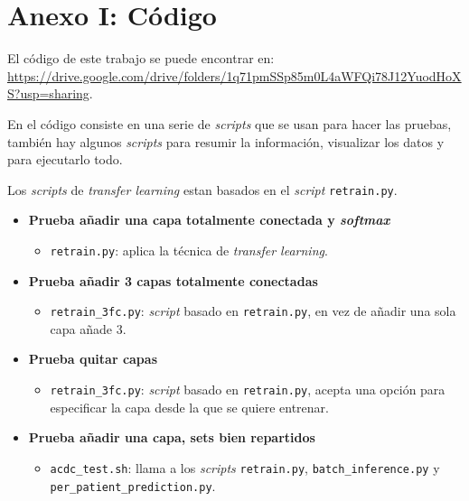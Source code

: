 \documentclass[12pt,a4paper]{article}
\begin{document}
\newpage
\appendix
\addappheadtotoc
\appendixpage
\section{Anexo I: Código}\label{anexo1}
El código de este trabajo se puede encontrar en: \url{https://drive.google.com/drive/folders/1q71pmSSp85m0L4aWFQi78J12YuodHoXS?usp=sharing}.
\bigskip

En el código consiste en una serie de \textit{scripts} que se usan para hacer las pruebas, también hay algunos \textit{scripts} para resumir la información, visualizar los datos y para ejecutarlo todo.
\bigskip

Los \textit{scripts} de \textit{transfer learning} estan basados en el \textit{script} \texttt{retrain.py}.

\begin{itemize}

\item \textbf{Prueba añadir una capa totalmente conectada y \textit{softmax}}

\begin{itemize}
\item \texttt{retrain.py}: aplica la técnica de \textit{transfer learning}.
\end{itemize}


\item \textbf{Prueba añadir 3 capas totalmente conectadas}

\begin{itemize}
\item \texttt{retrain\_3fc.py}: \textit{script} basado en \texttt{retrain.py}, en vez de añadir una sola capa añade 3.
\end{itemize}


\item \textbf{Prueba quitar capas}

\begin{itemize}
\item \texttt{retrain\_3fc.py}: \textit{script} basado en \texttt{retrain.py}, acepta una opción para especificar la capa desde la que se quiere entrenar.
\end{itemize}


\item \textbf{Prueba añadir una capa, sets bien repartidos}

\begin{itemize}
\item \texttt{acdc\_test.sh}: llama a los \textit{scripts} \texttt{retrain.py}, \texttt{batch\_inference.py} y \\ \texttt{per\_patient\_prediction.py}.


\end{itemize}
\end{itemize}
\end{document}
